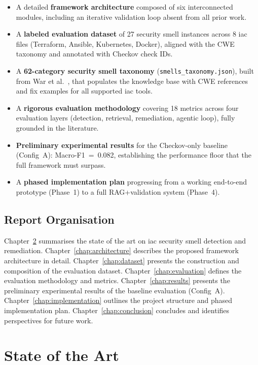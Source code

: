 \documentclass[12pt, a4paper]{report}
\begin{document}
\begin{itemize}
  \item A detailed \textbf{framework architecture} composed of six interconnected modules,
  including an iterative validation loop absent from all prior work.
  \item A \textbf{labeled evaluation dataset} of 27 security smell instances across 8
  \gls{iac} files (Terraform, Ansible, Kubernetes, Docker), aligned with the CWE taxonomy
  and annotated with Checkov check IDs.
  \item A \textbf{62-category security smell taxonomy} (\texttt{smells\_taxonomy.json}),
  built from War et al.~\citep{war2025taxonomy}, that populates the knowledge base with
  CWE references and fix examples for all supported \gls{iac} tools.
  \item A \textbf{rigorous evaluation methodology} covering 18 metrics across four
  evaluation layers (detection, retrieval, remediation, agentic loop), fully grounded in
  the literature.
  \item \textbf{Preliminary experimental results} for the Checkov-only baseline
  (Config~A): Macro-F1~=~0.082, establishing the performance floor that the full
  framework must surpass.
  \item A \textbf{phased implementation plan} progressing from a working end-to-end
  prototype (Phase~1) to a full RAG+validation system (Phase~4).
\end{itemize}

\section{Report Organisation}

Chapter~\ref{chap:sota} summarises the state of the art on \gls{iac} security smell
detection and remediation. Chapter~\ref{chap:architecture} describes the proposed
framework architecture in detail. Chapter~\ref{chap:dataset} presents the construction
and composition of the evaluation dataset. Chapter~\ref{chap:evaluation} defines the
evaluation methodology and metrics. Chapter~\ref{chap:results} presents the preliminary
experimental results of the baseline evaluation (Config~A). Chapter~\ref{chap:implementation}
outlines the project structure and phased implementation plan. Chapter~\ref{chap:conclusion}
concludes and identifies perspectives for future work.

\chapter{State of the Art}
\label{chap:sota}
\end{document}

